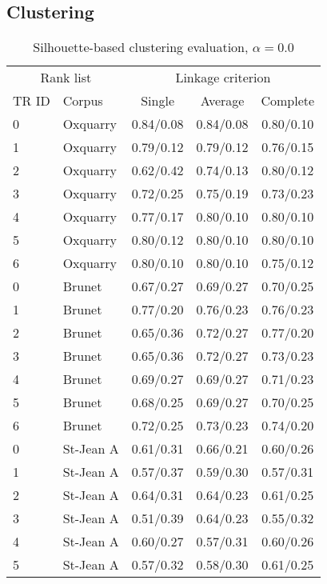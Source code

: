 \subsection{Clustering}

\begin{table}[H]
  \centering
  \caption{Silhouette-based clustering evaluation, $\alpha = 0.0$}
  \label{tab:silhouette-based_clustering_full}

  \begin{tabular}{l l c c c}
    \toprule
    \multicolumn{2}{c}{Rank list} & \multicolumn{3}{c}{Linkage criterion} \\
    TR ID & Corpus & Single & Average & Complete \\
    \midrule
    0 & Oxquarry & 0.84/0.08 & 0.84/0.08 & 0.80/0.10 \\
    1 & Oxquarry & 0.79/0.12 & 0.79/0.12 & 0.76/0.15 \\
    2 & Oxquarry & 0.62/0.42 & 0.74/0.13 & 0.80/0.12 \\
    3 & Oxquarry & 0.72/0.25 & 0.75/0.19 & 0.73/0.23 \\
    4 & Oxquarry & 0.77/0.17 & 0.80/0.10 & 0.80/0.10 \\
    5 & Oxquarry & 0.80/0.12 & 0.80/0.10 & 0.80/0.10 \\
    6 & Oxquarry & 0.80/0.10 & 0.80/0.10 & 0.75/0.12 \\
    0 & Brunet & 0.67/0.27 & 0.69/0.27 & 0.70/0.25 \\
    1 & Brunet & 0.77/0.20 & 0.76/0.23 & 0.76/0.23 \\
    2 & Brunet & 0.65/0.36 & 0.72/0.27 & 0.77/0.20 \\
    3 & Brunet & 0.65/0.36 & 0.72/0.27 & 0.73/0.23 \\
    4 & Brunet & 0.69/0.27 & 0.69/0.27 & 0.71/0.23 \\
    5 & Brunet & 0.68/0.25 & 0.69/0.27 & 0.70/0.25 \\
    6 & Brunet & 0.72/0.25 & 0.73/0.23 & 0.74/0.20 \\
    0 & St-Jean A & 0.61/0.31 & 0.66/0.21 & 0.60/0.26 \\
    1 & St-Jean A & 0.57/0.37 & 0.59/0.30 & 0.57/0.31 \\
    2 & St-Jean A & 0.64/0.31 & 0.64/0.23 & 0.61/0.25 \\
    3 & St-Jean A & 0.51/0.39 & 0.64/0.23 & 0.55/0.32 \\
    4 & St-Jean A & 0.60/0.27 & 0.57/0.31 & 0.60/0.26 \\
    5 & St-Jean A & 0.57/0.32 & 0.58/0.30 & 0.61/0.25 \\

\end{tabular}
\end{table}
